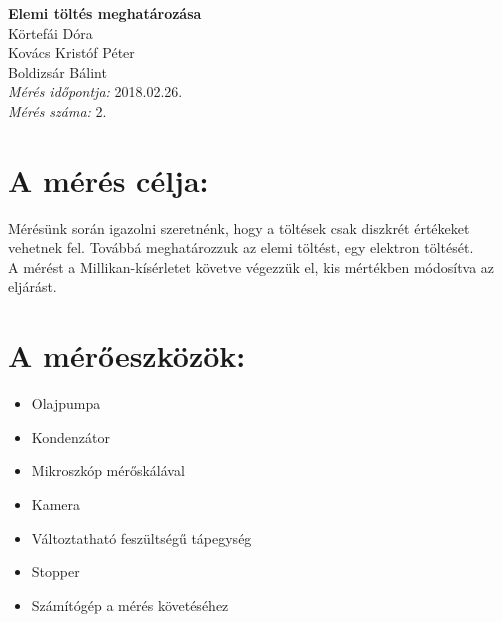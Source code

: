 \documentclass[a4paper]{article}
\begin{document}
\begin{titlepage}
	\begin{center}
		\vspace{1 cm}
		\Huge{\textbf{Elemi töltés meghatározása\\}}
		\vspace{2 cm}
		\Large{Körtefái Dóra\\Kovács Kristóf Péter\\Boldizsár Bálint\\}
		\vspace{1 cm}
		\Large{
			\textit{Mérés időpontja:} 2018.02.26.\\ 
			\textit{Mérés száma:} 2.\\}
	\end{center}
	
\end{titlepage}

\pagebreak

\section{A mérés célja:}
Mérésünk során igazolni szeretnénk, hogy a töltések csak diszkrét értékeket vehetnek fel. Továbbá meghatározzuk az elemi töltést, egy elektron töltését. \\
A mérést a Millikan-kísérletet követve végezzük el, kis mértékben módosítva az eljárást.

\section{A mérőeszközök:}
\begin{itemize}
        \item Olajpumpa
        \item Kondenzátor
        \item Mikroszkóp mérőskálával
        \item Kamera
		\item Változtatható feszültségű tápegység
        \item Stopper
        \item Számítógép a mérés követéséhez
\end{itemize}
\end{document}
